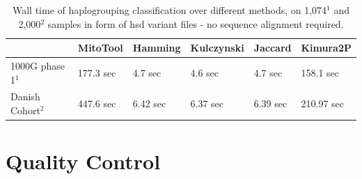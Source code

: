 \begin{table}[H]
\centering
\label{table:speed}
\begin{tabular}{|l|l|l|l|l|l|}
\hline
              & MitoTool  & Hamming  & Kulczynski & Jaccard  & Kimura2P   \\ \hline
1000G phase 1$^{1}$ & 177.3 sec & 4.7 sec  & 4.6 sec    & 4.7 sec  & 158.1 sec  \\ \hline
Danish Cohort$^{2}$ & 447.6 sec & 6.42 sec & 6.37 sec   & 6.39 sec & 210.97 sec \\ \hline
\end{tabular}
\caption{Wall time of haplogrouping classification over different methods, on 1,074$^{1}$ and 2,000$^{2}$ samples in form of hsd variant files - no sequence alignment required. }
\end{table}



\section{Quality Control}\label{hg:qc}
